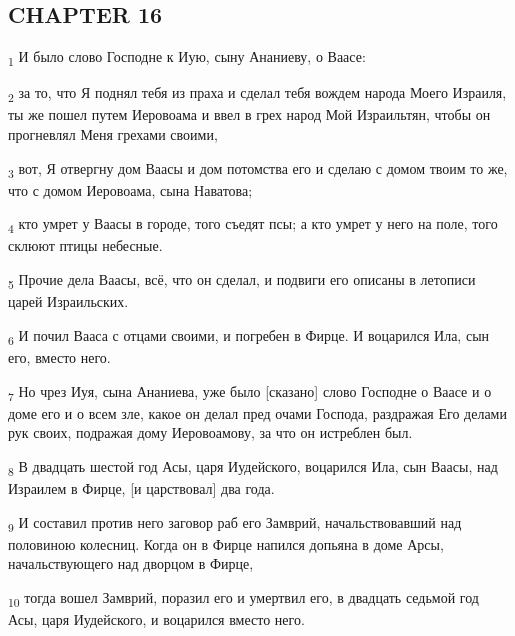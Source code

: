 \subsection{CHAPTER 16}
\begin{tcolorbox}
\textsubscript{1} И было слово Господне к Иую, сыну Ананиеву, о Ваасе:
\end{tcolorbox}
\begin{tcolorbox}
\textsubscript{2} за то, что Я поднял тебя из праха и сделал тебя вождем народа Моего Израиля, ты же пошел путем Иеровоама и ввел в грех народ Мой Израильтян, чтобы он прогневлял Меня грехами своими,
\end{tcolorbox}
\begin{tcolorbox}
\textsubscript{3} вот, Я отвергну дом Ваасы и дом потомства его и сделаю с домом твоим то же, что с домом Иеровоама, сына Наватова;
\end{tcolorbox}
\begin{tcolorbox}
\textsubscript{4} кто умрет у Ваасы в городе, того съедят псы; а кто умрет у него на поле, того склюют птицы небесные.
\end{tcolorbox}
\begin{tcolorbox}
\textsubscript{5} Прочие дела Ваасы, всё, что он сделал, и подвиги его описаны в летописи царей Израильских.
\end{tcolorbox}
\begin{tcolorbox}
\textsubscript{6} И почил Вааса с отцами своими, и погребен в Фирце. И воцарился Ила, сын его, вместо него.
\end{tcolorbox}
\begin{tcolorbox}
\textsubscript{7} Но чрез Иуя, сына Ананиева, уже было [сказано] слово Господне о Ваасе и о доме его и о всем зле, какое он делал пред очами Господа, раздражая Его делами рук своих, подражая дому Иеровоамову, за что он истреблен был.
\end{tcolorbox}
\begin{tcolorbox}
\textsubscript{8} В двадцать шестой год Асы, царя Иудейского, воцарился Ила, сын Ваасы, над Израилем в Фирце, [и царствовал] два года.
\end{tcolorbox}
\begin{tcolorbox}
\textsubscript{9} И составил против него заговор раб его Замврий, начальствовавший над половиною колесниц. Когда он в Фирце напился допьяна в доме Арсы, начальствующего над дворцом в Фирце,
\end{tcolorbox}
\begin{tcolorbox}
\textsubscript{10} тогда вошел Замврий, поразил его и умертвил его, в двадцать седьмой год Асы, царя Иудейского, и воцарился вместо него.
\end{tcolorbox}
